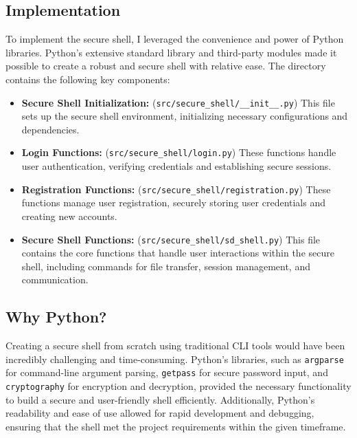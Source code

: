 \documentclass[12pt]{article}
\begin{document}
\subsection{Implementation}
To implement the secure shell, I leveraged the convenience and power of Python libraries. Python's extensive standard library and third-party modules made it possible to create a robust and secure shell with relative ease. The directory contains the following key components:

\begin{itemize}
    \item \textbf{Secure Shell Initialization:} (\texttt{src/secure\_shell/\_\_init\_\_.py}) This file sets up the secure shell environment, initializing necessary configurations and dependencies.
    \item \textbf{Login Functions:} (\texttt{src/secure\_shell/login.py}) These functions handle user authentication, verifying credentials and establishing secure sessions.
    \item \textbf{Registration Functions:} (\texttt{src/secure\_shell/registration.py}) These functions manage user registration, securely storing user credentials and creating new accounts.
    \item \textbf{Secure Shell Functions:} (\texttt{src/secure\_shell/sd\_shell.py}) This file contains the core functions that handle user interactions within the secure shell, including commands for file transfer, session management, and communication.
\end{itemize}

\subsection{Why Python?}
Creating a secure shell from scratch using traditional CLI tools would have been incredibly challenging and time-consuming. Python's libraries, such as \texttt{argparse} for command-line argument parsing, \texttt{getpass} for secure password input, and \texttt{cryptography} for encryption and decryption, provided the necessary functionality to build a secure and user-friendly shell efficiently. Additionally, Python's readability and ease of use allowed for rapid development and debugging, ensuring that the shell met the project requirements within the given timeframe.
\end{document}

